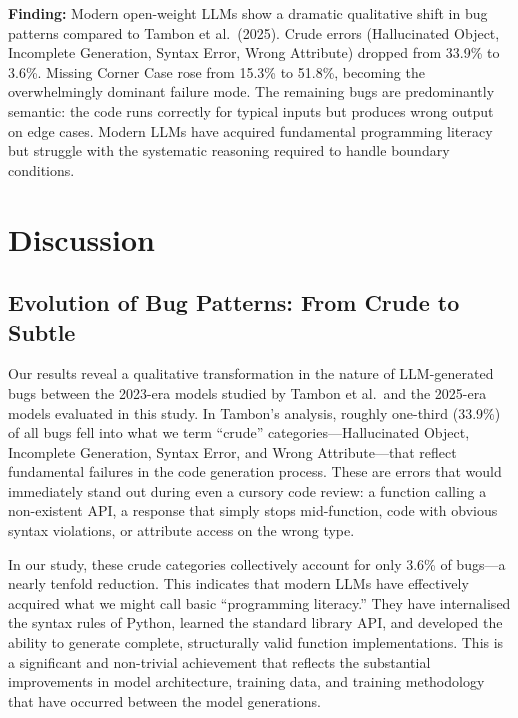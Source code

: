 \documentclass[smallextended]{svjour3}
\begin{document}
\begin{tcolorbox}[colback=gray!5, colframe=gray!40, title=Summary for RQ3]
\textbf{Finding:} Modern open-weight LLMs show a dramatic qualitative shift in bug patterns compared to Tambon et al.\ (2025). Crude errors (Hallucinated Object, Incomplete Generation, Syntax Error, Wrong Attribute) dropped from 33.9\% to 3.6\%. Missing Corner Case rose from 15.3\% to 51.8\%, becoming the overwhelmingly dominant failure mode. The remaining bugs are predominantly semantic: the code runs correctly for typical inputs but produces wrong output on edge cases. Modern LLMs have acquired fundamental programming literacy but struggle with the systematic reasoning required to handle boundary conditions.
\end{tcolorbox}

\section{Discussion}
\label{sec:discussion}

\subsection{Evolution of Bug Patterns: From Crude to Subtle}

Our results reveal a qualitative transformation in the nature of LLM-generated bugs between the 2023-era models studied by Tambon et al.\ and the 2025-era models evaluated in this study. In Tambon's analysis, roughly one-third (33.9\%) of all bugs fell into what we term ``crude'' categories---Hallucinated Object, Incomplete Generation, Syntax Error, and Wrong Attribute---that reflect fundamental failures in the code generation process. These are errors that would immediately stand out during even a cursory code review: a function calling a non-existent API, a response that simply stops mid-function, code with obvious syntax violations, or attribute access on the wrong type.

In our study, these crude categories collectively account for only 3.6\% of bugs---a nearly tenfold reduction. This indicates that modern LLMs have effectively acquired what we might call basic ``programming literacy.'' They have internalised the syntax rules of Python, learned the standard library API, and developed the ability to generate complete, structurally valid function implementations. This is a significant and non-trivial achievement that reflects the substantial improvements in model architecture, training data, and training methodology that have occurred between the model generations.
\end{document}
